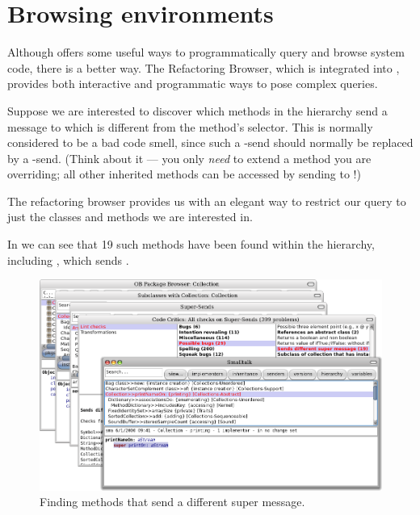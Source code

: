 \documentclass[a4paper,10pt,twoside]{book}
\begin{document}
\section{Browsing environments}

Although  offers some useful ways to programmatically query and browse system code, there is a better way.  The Refactoring Browser, which is integrated into \pharo, provides both interactive and programmatic ways to pose complex queries.

Suppose we are interested to discover which methods in the  hierarchy send a message to \super which is different from the method's selector.
This is normally considered to be a bad code smell, since such a \super-send should normally be replaced by a \self-send. (Think about it --- you only \emph{need} \super to extend a method you are overriding; all other inherited methods can be accessed by sending to \self!)

The refactoring browser provides us with an elegant way to restrict our query to just the classes and methods we are interested in.


In  we can see that 19 such methods have been found within the  hierarchy, including , which sends .
\begin{figure}[ht]\centering
	\includegraphics[width=\linewidth]{sendDifferentSuper}
	\caption{Finding methods that send a different super message.\label{fig:sendDifferentSuper}}
\end{figure}
\end{document}
